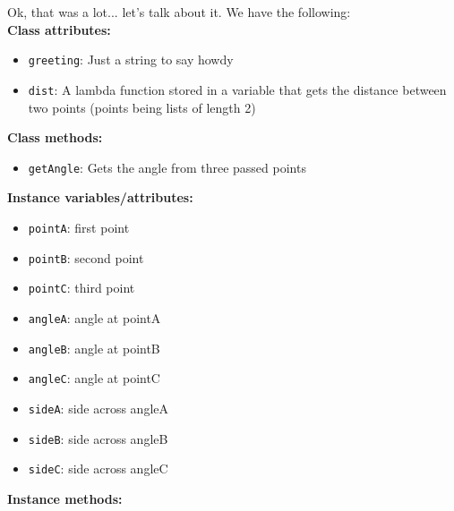 \documentclass[12pt]{article}
\begin{document}
Ok, that was a lot... let's talk about it. We have the following:\\
\textbf{Class attributes:}
\begin{itemize} \item \texttt{greeting}: Just a string to say howdy\end{itemize}
\begin{itemize} \item \texttt{dist}: A lambda function stored in a variable that gets the distance between two points (points being lists of length 2)\end{itemize}
\textbf{Class methods:}
\begin{itemize} \item \texttt{getAngle}: Gets the angle from three passed points\end{itemize}
\textbf{Instance variables/attributes:}
\begin{itemize} \item \texttt{pointA}: first point\end{itemize}
\begin{itemize} \item \texttt{pointB}: second point\end{itemize}
\begin{itemize} \item \texttt{pointC}: third point\end{itemize}
\begin{itemize} \item \texttt{angleA}: angle at pointA\end{itemize}
\begin{itemize} \item \texttt{angleB}: angle at pointB\end{itemize}
\begin{itemize} \item \texttt{angleC}: angle at pointC\end{itemize}
\begin{itemize} \item \texttt{sideA}: side across angleA\end{itemize}
\begin{itemize} \item \texttt{sideB}: side across angleB\end{itemize}
\begin{itemize} \item \texttt{sideC}: side across angleC\end{itemize}
\textbf{Instance methods:}
\end{document}
